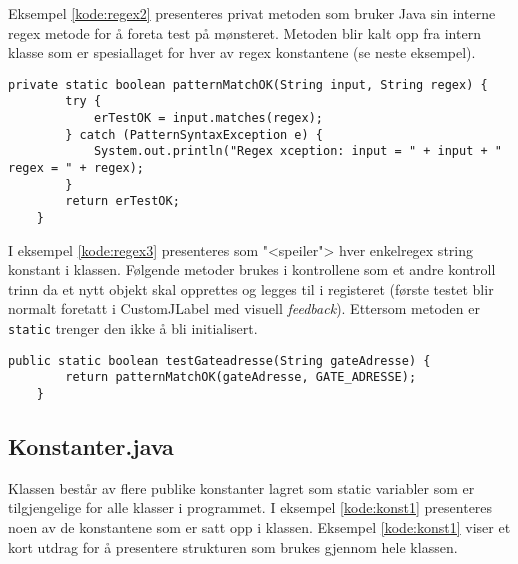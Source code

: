 Eksempel \ref{kode:regex2} presenteres privat metoden som bruker Java
sin interne regex metode for å foreta test på mønsteret. Metoden blir kalt opp fra intern klasse som er spesiallaget for hver av regex konstantene (se neste eksempel).

\begin{lstlisting}[caption=Private regex test metode., label=kode:regex2]
	private static boolean patternMatchOK(String input, String regex) {
        try {
            erTestOK = input.matches(regex);
        } catch (PatternSyntaxException e) {
            System.out.println("Regex xception: input = " + input + " regex = " + regex);
        }
        return erTestOK;
  	}
\end{lstlisting}


I eksempel \ref{kode:regex3} presenteres som "<speiler"> hver enkelregex string konstant i klassen. Følgende metoder brukes i kontrollene som et andre kontroll trinn da et nytt objekt skal opprettes og legges til i registeret (første testet blir normalt foretatt i CustomJLabel med visuell \textit{feedback}). Ettersom metoden er \texttt{static} trenger den ikke å bli initialisert. 


\begin{lstlisting}[caption=Static regex metode til tilhørende regex møsnter streng., label=kode:regex3]
    public static boolean testGateadresse(String gateAdresse) {
        return patternMatchOK(gateAdresse, GATE_ADRESSE);
    }
\end{lstlisting}


\subsection{Konstanter.java} \label{subsec:konstanter}
Klassen består av flere publike konstanter lagret som static variabler som er tilgjengelige for alle klasser i programmet. I eksempel \ref{kode:konst1} presenteres noen av de konstantene som er satt opp i klassen. Eksempel \ref{kode:konst1} viser et kort utdrag for å presentere strukturen som brukes gjennom hele klassen.

